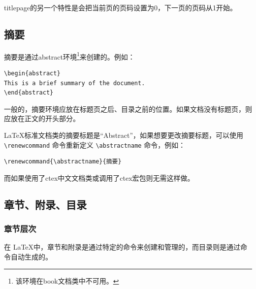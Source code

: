 titlepage的另一个特性是会把当前页的页码设置为0，下一页的页码从1开始。

\subsection{摘要}

摘要是通过abstract环境\footnote{该环境在book文档类中不可用。}来创建的。例如：
\begin{verbatim}
\begin{abstract}
This is a brief summary of the document.
\end{abstract}
\end{verbatim}

一般的，摘要环境应放在标题页之后、目录之前的位置。如果文档没有标题页，则应放在正文的开头部分。

\LaTeX 标准文档类的摘要标题是“Abstract”，如果想要更改摘要标题，可以使用 \verb|\renewcommand| 命令重新定义 \verb|\abstractname| 命令，例如：
\begin{verbatim}
\renewcommand{\abstractname}{摘要}
\end{verbatim}

而如果使用了ctex中文文档类或调用了ctex宏包则无需这样做。

\subsection{章节、附录、目录}

\subsubsection{章节层次}

在 \LaTeX 中，章节和附录是通过特定的命令来创建和管理的，而目录则是通过命令自动生成的。

